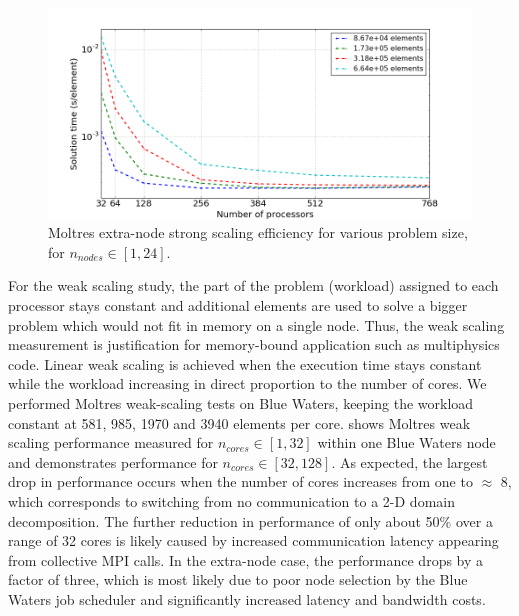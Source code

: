 \documentclass{article}
\makeatletter
\def\maxwidth#1{\ifdim\Gin@nat@width>#1 #1\else\Gin@nat@width\fi}
\makeatother
\begin{document}
\begin{figure}[htpb]
  \centering
  \includegraphics[width=\maxwidth{\textwidth}]{extra-node_strong.png}
  \caption{Moltres extra-node strong scaling efficiency for various problem size, for $n_{nodes} \in [1,24]$.}
  \label{fig:extra_strong_scaling}
\end{figure}

For the weak scaling study, the part of the problem (workload) assigned
to each processor stays constant and additional elements are used to
solve a bigger problem which would not fit in memory on a single node.
Thus, the weak scaling measurement is justification for memory-bound
application such as multiphysics code. Linear weak scaling is achieved
when the execution time stays constant while the workload increasing
in direct proportion to the number of cores. We performed Moltres
weak-scaling tests on Blue Waters, keeping the workload constant at
581, 985, 1970 and 3940 elements per core.  shows
Moltres weak scaling performance measured for $n_{cores} \in [1,32]$ within
one Blue Waters node and  demonstrates performance
for $n_{cores} \in [32,128]$. As expected, the largest drop in performance 
occurs when the number of cores increases from one to $\approx$ 8, which 
corresponds to switching from no communication to a 2-D domain
decomposition. The further reduction in performance of only about 50\%
over a range of 32 cores is likely caused by increased communication
latency appearing from collective \gls{MPI} calls. In the extra-node case,
the performance drops by a factor of three, which is most likely due to poor node
selection by the Blue Waters job scheduler and significantly increased latency and
bandwidth costs.
\end{document}
